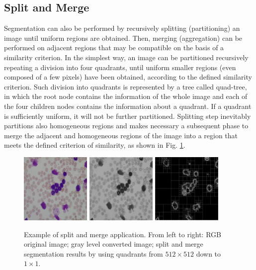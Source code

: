 \documentclass[final,a4paper,12pt,english]{UnicaPhdThesis3}
\begin{document}
\subsection{Split and Merge} 
Segmentation can also be performed by recursively splitting (partitioning) an image until uniform regions are obtained. Then, merging (aggregation) can be performed on adjacent regions that may be compatible on the basis of a similarity criterion. In the simplest way, an image can be partitioned recursively repeating a division into four quadrants, until uniform smaller regions (even composed of a few pixels) have been obtained, according to the defined similarity criterion. Such division into quadrants is represented by a tree called quad-tree, in which the root node contains the information of the whole image and each of the four children nodes contains the information about a quadrant. If a quadrant is sufficiently uniform, it will not be further partitioned. Splitting step inevitably partitions also homogeneous regions and makes necessary a subsequent phase to merge the adjacent and homogeneous regions of the image into a region that meets the defined criterion of similarity, as shown in Fig. \ref{fig:splitMerge}.

\begin{figure}[h]
	\centering
	\includegraphics[width=0.3\textwidth]{images/fig_rgbSplitMerge0}
	\includegraphics[width=0.3\textwidth]{images/fig_rgbSplitMerge1}
	\includegraphics[width=0.3\textwidth]{images/fig_splitMerge}
	\caption{\label{fig:splitMerge}Example of split and merge application. From left to right: RGB original image; gray level converted image; split and merge segmentation results by using quadrants from $512 \times 512$ down to $1 \times 1$.}
\end{figure}
\end{document}
